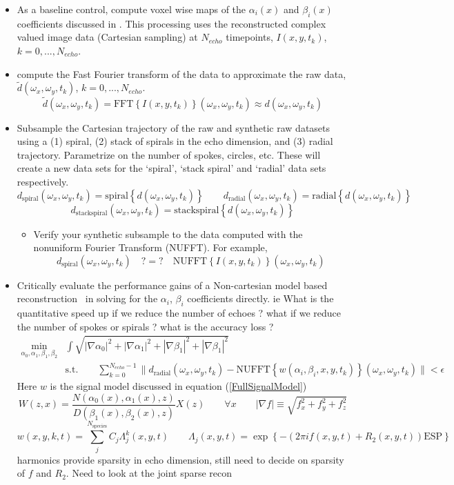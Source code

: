 \documentclass[10pt]{amsart}
\newcommand{\eqn}[1]{(\ref{#1})}
\begin{document}
\begin{itemize}
\begin{itemize}
\[       \]
  \end{itemize}
 \item As a baseline control, compute voxel wise maps of the $\alpha_i(x)$
       and $\beta_i(x)$ coefficients discussed in \cite{Taylor2008}.
       This processing uses the reconstructed complex valued image data (Cartesian sampling) 
       at $N_{echo}$ timepoints, $I(x,y,t_k)$, $k = 0,..., N_{echo}$. 
 \item compute the Fast Fourier transform of the data to approximate the
raw data, $\tilde{d}(\omega_x,\omega_y,t_k)$, $k = 0,..., N_{echo}$.
\[
\tilde{d}(\omega_x,\omega_y,t_k) = \text{FFT} \left\{I(x,y,t_k)\right\}(\omega_x,\omega_y,t_k) \approx d(\omega_x,\omega_y,t_k)  
\]
 \item Subsample the Cartesian trajectory of the raw and synthetic raw
datasets using a (1) spiral, (2) stack of spirals in the echo dimension, and (3) radial trajectory. Parametrize
on the number of spokes, circles, etc. These will create a
new data sets for the `spiral', `stack spiral' and `radial' data sets respectively.
  \[
    d_\text{spiral}(\omega_x,\omega_y,t_k)   = \text{spiral} \left\{ d(\omega_x,\omega_y,t_k) \right\}
    \qquad
    d_\text{radial}(\omega_x,\omega_y,t_k)   = \text{radial} \left\{ d(\omega_x,\omega_y,t_k) \right\}
  \]
  \[
    d_\text{stackspiral}(\omega_x,\omega_y,t_k)   = \text{stackspiral} \left\{ d(\omega_x,\omega_y,t_k) \right\}
  \]
  \begin{itemize}
    \item Verify your synthetic subsample to the data computed  with the
          nonuniform Fourier Transform  (NUFFT). For example,
     \[
        d_\text{spiral}(\omega_x,\omega_y,t_k)  \quad ?=? \quad \text{NUFFT}  \left\{I(x,y,t_k)\right\} (\omega_x,\omega_y,t_k)
     \]
  \end{itemize}
 \item Critically evaluate the performance gains of a Non-cartesian model
based reconstruction~\cite{Wright2014} in solving for the $\alpha_i$,
$\beta_i$ coefficients directly. ie What is the quantitative speed up 
if we reduce the number of echoes ?  what if we reduce the number of spokes or spirals ? 
what is the accuracy loss ? 
\[
\begin{split}
\min_{\alpha_0,\alpha_1,\beta_1,\beta_2} & 
\int \sqrt{|\nabla \alpha_0|^2 + |\nabla \alpha_1|^2 + |\nabla \beta_1|^2 + |\nabla \beta_1|^2}
\\
& \text{s.t.} \qquad
\sum_{k=0}^{N_{echo} -1}
\|
  d_\text{radial}(\omega_x,\omega_y,t_k)  
- \text{NUFFT}  \left\{w(\alpha_i, \beta_i,x,y,t_k)\right\} (\omega_x,\omega_y,t_k)
\| < \epsilon
\end{split}
\]
Here $w$ is the signal model discussed  in equation \eqn{FullSignalModel}
\[
W(z,x) = \frac{N(\alpha_0(x),\alpha_1(x),z)}{D(\beta_1(x),\beta_2(x),z)} X(z) \qquad \forall x
\qquad
|\nabla f| \equiv \sqrt{f_x^2+f_y^2+f_z^2}
\]
\[
     w (x,y,k,t) = \sum_j^{N_\text{species}} C_j \Lambda_j^k(x,y,t) 
    \qquad
      \Lambda_j(x,y,t)  = \exp \left\{ -\left( 2 \pi i f (x,y,t) +
R_2(x,y,t) \right) \text{ESP} \right \}
\]
{\color{red} harmonics provide sparsity in echo dimension, still need to
decide on sparsity of $f$ and $R_2$. Need to look at the joint sparse recon} 
\end{itemize}
\end{document}
